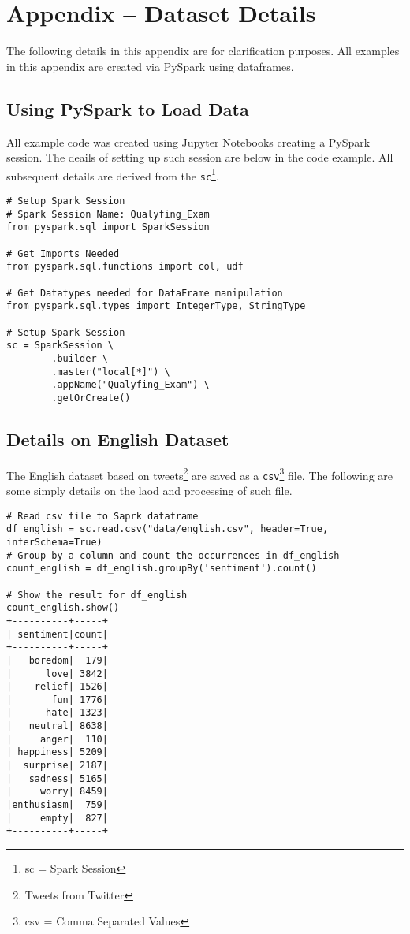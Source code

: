 \section{Appendix -- Dataset Details}
The following details in this appendix are for clarification purposes.
All examples in this appendix are created via PySpark using dataframes.

\subsection{Using PySpark to Load Data}
All example code was created using Jupyter Notebooks creating a PySpark session. The deails of setting up such session are below in the code example. All subsequent details are derived from the \texttt{sc}\footnote{sc = Spark Session}.
\begin{verbatim}
# Setup Spark Session
# Spark Session Name: Qualyfing_Exam
from pyspark.sql import SparkSession

# Get Imports Needed
from pyspark.sql.functions import col, udf

# Get Datatypes needed for DataFrame manipulation
from pyspark.sql.types import IntegerType, StringType

# Setup Spark Session
sc = SparkSession \
        .builder \
        .master("local[*]") \
        .appName("Qualyfing_Exam") \
        .getOrCreate()
\end{verbatim}


\subsection{Details on English Dataset}
The English dataset based on tweets\footnote{Tweets from Twitter} are saved as a \texttt{csv}\footnote{csv = Comma Separated Values} file. The following are some simply details on the laod and processing of such file.
\begin{verbatim}
# Read csv file to Saprk dataframe
df_english = sc.read.csv("data/english.csv", header=True, inferSchema=True)
# Group by a column and count the occurrences in df_english
count_english = df_english.groupBy('sentiment').count()

# Show the result for df_english
count_english.show()
+----------+-----+
| sentiment|count|
+----------+-----+
|   boredom|  179|
|      love| 3842|
|    relief| 1526|
|       fun| 1776|
|      hate| 1323|
|   neutral| 8638|
|     anger|  110|
| happiness| 5209|
|  surprise| 2187|
|   sadness| 5165|
|     worry| 8459|
|enthusiasm|  759|
|     empty|  827|
+----------+-----+

\end{verbatim}

